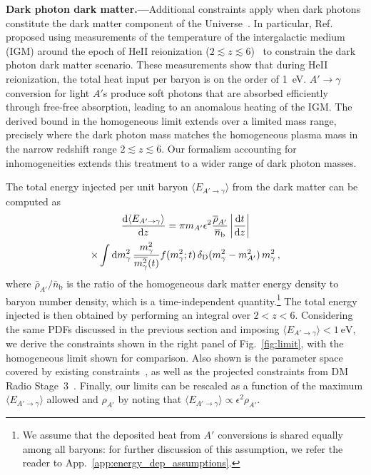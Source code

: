 \documentclass[prd,aps,10pt,nofootinbib,twocolumn,superscriptaddress,preprintnumbers,balancelastpage,longbibliography]{revtex4-1}
\begin{document}
\noindent
{\bf Dark photon dark matter.---}Additional constraints apply when dark photons constitute the dark matter component of the Universe~\cite{Redondo:2008ec,Arias:2012az, Agrawal:2018vin,Long:2019lwl,Co:2018lka}. In particular, Ref.~\cite{McDermott:2019lch} proposed using measurements of the temperature of the intergalactic medium (IGM) around the epoch of HeII reionization ($2 \lesssim z \lesssim 6$)~\cite{Becker:2010cu,Bolton:2013cba,Boera:2014sia,Rorai:2017qft,Hiss:2017qyw,Walther:2018pnn} to constrain the dark photon dark matter scenario. These measurements show that during HeII reionization, the total heat input per baryon is on the order of \SI{1}{\eV}. $A'\to\gamma$ conversion for light $A'$s produce soft photons that are absorbed efficiently through free-free absorption, leading to an anomalous heating of the IGM\@. The derived bound in the homogeneous limit extends over a limited mass range, precisely where the dark photon mass matches the homogeneous plasma mass in the narrow redshift range $2 \lesssim z \lesssim 6$. Our formalism accounting for inhomogeneities extends this treatment to a wider range of dark photon masses. 

The total energy injected per unit baryon $\langle E_{A' \to \gamma} \rangle$ from the dark matter can be computed as
%
\begin{multline}  \label{eq:prob_dm}
     \frac{\mathrm{d} \langle E_{A' \to \gamma} \rangle}{\mathrm{d} z} = \pi m_{A^\prime} \epsilon^2 \frac{\overline{\rho}_{A'}}{\overline{n}_{\mathrm{b}}} \left|\frac{\mathrm{d} t}{\mathrm{d} z}\right| \\ 
     \times \int \mathrm{d} m_\gamma^2 \, \frac{m_\gamma^2}{\overline{m_\gamma^2}(t)} f(m_\gamma^2;t) \, \delta_\mathrm{D}(m_\gamma^2 - m_{A^\prime}^2) \, m_\gamma^2   \,,
\end{multline}
%
where $\bar{\rho}_{A'} / \bar{n}_\mathrm{b}$ is the ratio of the homogeneous dark matter energy density to baryon number density, which is a time-independent quantity.\footnote{We assume that the deposited heat from $A'$ conversions is shared equally among all baryons: for further discussion of this assumption, we refer the reader to App.~\ref{app:energy_dep_assumptions}.} The total energy injected is then obtained by performing an integral over $2 < z < 6$. Considering the same PDFs discussed in the previous section and imposing $\langle E_{A' \to \gamma} \rangle < \SI{1}{\eV}$, we derive the constraints shown in the right panel of Fig.~\ref{fig:limit}, with the homogeneous limit shown for comparison. Also shown is the parameter space covered by existing constraints~\cite{McDermott:2019lch,Wadekar:2019xnf}, as well as the projected constraints from DM Radio Stage~3~\cite{Chaudhuri:2014dla,Silva-Feaver:2016qhh,Battaglieri:2017aum}.  Finally, our limits can be rescaled as a function of the maximum $\langle E_{A' \to \gamma} \rangle$ allowed and $\rho_{A'}$ by noting that $\langle E_{A' \to \gamma} \rangle \propto \epsilon^2 \rho_{A'}$. 
\end{document}
